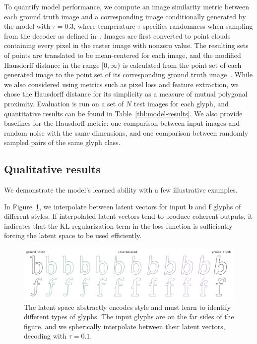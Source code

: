 To quantify model performance, we compute an image similarity metric between each ground truth image and a corresponding image conditionally generated by the model with $\tau = 0.3$, where temperature $\tau$ specifies randomness when sampling from the decoder as defined in~\cite{ha2017neural}.
Images are first converted to point clouds containing every pixel in the raster image with nonzero value.
The resulting sets of points are translated to be mean-centered for each image, and the modified Hausdorff distance in the range $[0, \infty\}$ is calculated from the point set of each generated image to the point set of its corresponding ground truth image~\cite{dubuisson1994modified}.
While we also considered using metrics such as pixel loss and feature extraction, we chose the Hausdorff distance for its simplicity as a measure of mutual polygonal proximity.
Evaluation is run on a set of $N$ test images for each glyph, and quantitative results can be found in Table~\ref{tbl:model-results}.
We also provide baselines for the Hausdorff metric: one comparison between input images and random noise with the same dimensions, and one comparison between randomly sampled pairs of the same glyph class.

\subsection{Qualitative results}
We demonstrate the model's learned ability with a few illustrative examples.

In Figure~\ref{fig:interp}, we interpolate between latent vectors for input \textbf{b} and \textbf{f} glyphs of different styles.
If interpolated latent vectors tend to produce coherent outputs, it indicates that the KL regularization term in the loss function is sufficiently forcing the latent space to be used efficiently.
\begin{figure}[h]
    \centering
	\includegraphics[width=\textwidth]{figures/interp}
    \caption[Latent space interpolation for the single-class model]
    {The latent space abstractly encodes style and must learn to identify different types of glyphs.
    The input glyphs are on the far sides of the figure, and we spherically interpolate between their latent vectors, decoding with $\tau=0.1$.\label{fig:interp}}
\end{figure}

